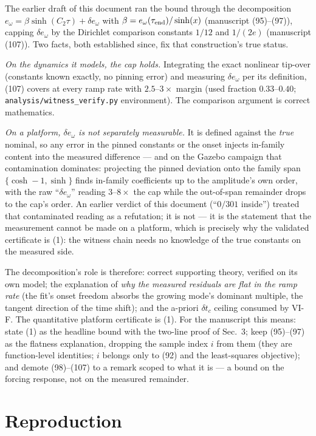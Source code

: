 \documentclass[10pt]{article}
\begin{document}
The earlier draft of this document ran the bound through the
decomposition $e_\omega = \beta\sinh(C_2\tau) + \delta e_\omega$
with $\beta = e_\omega(\tau_{\rm end})/\sinh(x)$ (manuscript
(95)--(97)), capping $\delta e_\omega$ by the Dirichlet comparison
constants $1/12$ and $1/(2e)$ (manuscript (107)). Two facts, both
established since, fix that construction's true status.

\emph{On the dynamics it models, the cap holds.} Integrating the
exact nonlinear tip-over (constants known exactly, no pinning
error) and measuring $\delta e_\omega$ per its definition, (107)
covers at every ramp rate with $2.5$--$3\times$ margin (used
fraction $0.33$--$0.40$; \texttt{analysis/witness\_verify.py}
environment). The comparison argument is correct mathematics.

\emph{On a platform, $\delta e_\omega$ is not separately
measurable.} It is defined against the \emph{true} nominal, so any
error in the pinned constants or the onset injects in-family
content into the measured difference --- and on the Gazebo campaign
that contamination dominates: projecting the pinned deviation onto
the family span $\{\cosh - 1, \sinh\}$ finds in-family coefficients
up to the amplitude's own order, with the raw ``$\delta e_\omega$''
reading $3$--$8\times$ the cap while the out-of-span remainder
drops to the cap's order. An earlier verdict of this document
(``$0/301$ inside'') treated that contaminated reading as a
refutation; it is not --- it is the statement that the measurement
cannot be made on a platform, which is precisely why the validated
certificate is (1): the witness chain needs no knowledge of the
true constants on the measured side.

The decomposition's role is therefore: correct supporting theory,
verified on its own model; the explanation of \emph{why the
measured residuals are flat in the ramp rate} (the fit's onset
freedom absorbs the growing mode's dominant multiple, the tangent
direction of the time shift); and the a-priori $\delta t_c$ ceiling
consumed by VI-F. The quantitative platform certificate is (1). For the manuscript this means: state (1) as the
headline bound with the two-line proof of Sec.~3; keep (95)--(97) as
the flatness explanation, dropping the sample index $i$ from them
(they are function-level identities; $i$ belongs only to (92) and
the least-squares objective); and demote (98)--(107) to a remark
scoped to what it is --- a bound on the forcing response, not on the
measured remainder.

\section{Reproduction}
\end{document}

